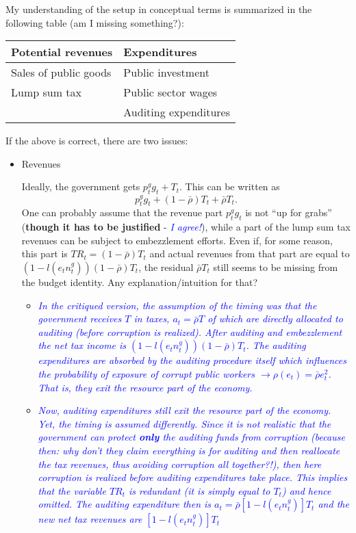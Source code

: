 \documentclass[]{scrartcl}
\begin{document}
\begin{enumerate}
My understanding of the setup in conceptual terms is summarized in the following table (am I missing something?):

\begin{tabular}{l|l}
\hline
Potential revenues & Expenditures \\ \hline
Sales of public goods & Public investment \\
Lump sum tax & Public sector wages \\
{} & Auditing expenditures
\end{tabular}

If the above is correct, there are two issues:
\begin{itemize}
\item Revenues

Ideally, the government gets $ p^g_t g_t + T_t $. This can be written as \[  p^g_t g_t + (1-\bar{\rho}) T_t + \bar{\rho} T_t. \] One can probably assume that the revenue part $p^g_t g_t$ is not ``up for grabs'' (\textbf{though it has to be justified} - \textit{\textcolor{blue}{I agree!}}), while a part of the lump sum tax revenues can be subject to embezzlement efforts. Even if, for some reason, this part is $ TR_t = (1-\bar{\rho}) T_t $ and actual revenues from that part are equal to $ (1-l(e_t n_t^g))(1-\bar{\rho}) T_t $, the residual $ \bar{\rho} T_t $ still seems to be missing from the budget identity. Any explanation/intuition for that?
\begin{itemize}
\item \textit{\textcolor{blue}{In the critiqued version, the assumption of the timing was that the government receives $ T $ in taxes, $ a_t=\bar{\rho}T $ of which are directly allocated to auditing (before corruption is realized). After auditing and embezzlement the net tax income is $ (1-l(e_t n_t^g))(1-\bar{\rho}) T_t $. The auditing expenditures are absorbed by the auditing procedure itself which influences the probability of exposure of corrupt public workers $ \rightarrow \rho(e_t)=\bar{\rho}e_t^2$. That is, they exit the resource part of the economy.}}
\item \textcolor{blue}{\textit{Now, auditing expenditures still exit the resource part of the economy. Yet, the timing is assumed differently. Since it is not realistic that the government can protect \textbf{only} the auditing funds from corruption (because then: why don't they claim everything is for auditing and then reallocate the tax revenues, thus avoiding corruption all together?!), then here corruption is realized before auditing expenditures take place. This implies that the variable $ TR_t $ is redundant (it is simply equal to $ T_t $) and hence omitted. The auditing expenditure then is $ a_t= \bar{\rho}\left[ 1-l\left( e_tn_t^g \right) \right]T_t $ and the new net tax revenues are $ \left[ 1-l\left( e_tn_t^g \right) \right]T_t $}}

\end{itemize}
\end{itemize}
\end{enumerate}
\end{document}
